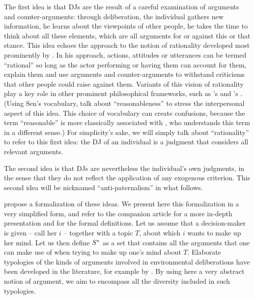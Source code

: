 \documentclass[version=3.21, pagesize, twoside=off, bibliography=totoc, DIV=calc, fontsize=12pt, a4paper, french, english]{scrartcl}
\begin{document}
The first idea is that \acp{DJ} are the result of a careful examination of arguments and counter-arguments: through deliberation, the individual gathers new information, he learns about the viewpoints of other people, he takes the time to think about all these elements, 
which are all arguments for or against this or that stance. 
This idea echoes the approach to the notion of rationality developed most prominently by \citet{habermas_theorie_1981}. 
In his approach, actions, attitudes or utterances can be termed “rational” so long as the actor performing or having them can account for them, explain them and use arguments and counter-arguments to withstand criticisms that other people could raise against them. 
Variants of this vision of rationality play a key role in other prominent philosophical frameworks, such as \citeauthor{scanlon_what_2000}’s \citeyearpar{scanlon_what_2000} and \citeauthor{sen_idea_2009}’s \citeyearpar{sen_idea_2009}. 
(Using Sen's vocabulary, \citeauthor{bartkowski_beyond_2018} talk about ``reasonableness'' to stress the interpersonal aspect of this idea. 
This choice of vocabulary can create confusions, because the term ``reasonable'' is more classically associated with \citet{rawls_political_2005}, who understands this term in a different sense.) 
For simplicity's sake, we will simply talk about ``rationality'' to refer to this first idea: the \ac{DJ} of an individual is a judgment that considers all relevant arguments.

The second idea is that \acp{DJ} are nevertheless the individual's own judgments, in the sense that they do not reflect the application of any exogenous criterion. 
This second idea will be nicknamed ``anti-paternalism'' in what follows. 

\citet{cailloux_formal_2018} propose a formalization of these ideas. We present here this formalization in a very simplified form, and refer to the companion article for a more in-depth presentation and for the formal definitions. 
Let us assume that a decision-maker is given -- call her $i$ -- together with a topic $T$, about which $i$ wants to make up her mind. 
Let us then define $S^*$ as a set that contains all the arguments that one can make use of when trying to make up one’s mind about $T$.
Elaborate typologies of the kinds of arguments involved in environmental deliberations have been developed in the literature, for example by \citet{chateauraynaud_contrainte_2007}. 
By using here a very abstract notion of argument, we aim to encompass all the diversity included in such typologies. 
\end{document}
